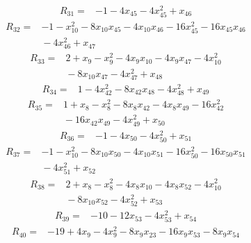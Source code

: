 {\begin{align*}
\end{align*}
\begin{align*}
R_{31} ={}& -1 - 4x_{45} - 4x_{45}^{2} + x_{46}
\end{align*}
\begin{align*}
R_{32} ={}& -1 - x_{10}^{2} - 8x_{10} x_{45} - 4x_{10} x_{46} - 16x_{45}^{2} - 16x_{45} x_{46} \\
&{}  - 4x_{46}^{2} + x_{47}
\end{align*}
\begin{align*}
R_{33} ={}& 2 + x_{9} - x_{9}^{2} - 4x_{9} x_{10} - 4x_{9} x_{47} - 4x_{10}^{2} \\
&{}  - 8x_{10} x_{47} - 4x_{47}^{2} + x_{48}
\end{align*}
\begin{align*}
R_{34} ={}& 1 - 4x_{42}^{2} - 8x_{42} x_{48} - 4x_{48}^{2} + x_{49}
\end{align*}
\begin{align*}
R_{35} ={}& 1 + x_{8} - x_{8}^{2} - 8x_{8} x_{42} - 4x_{8} x_{49} - 16x_{42}^{2} \\
&{}  - 16x_{42} x_{49} - 4x_{49}^{2} + x_{50}
\end{align*}
\begin{align*}
R_{36} ={}& -1 - 4x_{50} - 4x_{50}^{2} + x_{51}
\end{align*}
\begin{align*}
R_{37} ={}& -1 - x_{10}^{2} - 8x_{10} x_{50} - 4x_{10} x_{51} - 16x_{50}^{2} - 16x_{50} x_{51} \\
&{}  - 4x_{51}^{2} + x_{52}
\end{align*}
\begin{align*}
R_{38} ={}& 2 + x_{8} - x_{8}^{2} - 4x_{8} x_{10} - 4x_{8} x_{52} - 4x_{10}^{2} \\
&{}  - 8x_{10} x_{52} - 4x_{52}^{2} + x_{53}
\end{align*}
\begin{align*}
R_{39} ={}& -10 - 12x_{53} - 4x_{53}^{2} + x_{54}
\end{align*}
\begin{align*}
R_{40} ={}& -19 + 4x_{9} - 4x_{9}^{2} - 8x_{9} x_{23} - 16x_{9} x_{53} - 8x_{9} x_{54} \\

\end{align*}}
